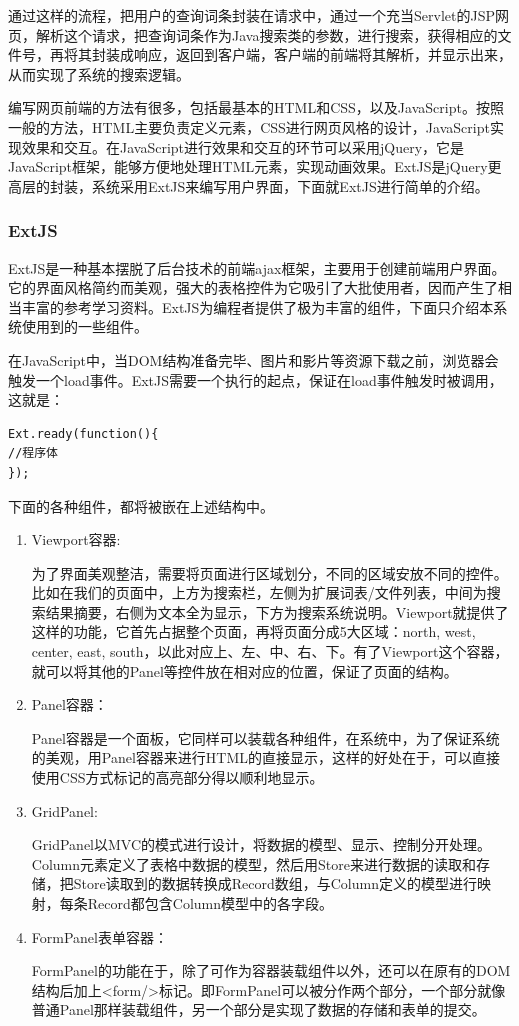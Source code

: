 \documentclass[12pt,a4paper]{article}
\begin{document}
	通过这样的流程，把用户的查询词条封装在请求中，通过一个充当Servlet的JSP网页，解析这个请求，把查询词条作为Java搜索类的参数，进行搜索，获得相应的文件号，再将其封装成响应，返回到客户端，客户端的前端将其解析，并显示出来，从而实现了系统的搜索逻辑。
	
	编写网页前端的方法有很多，包括最基本的HTML和CSS，以及JavaScript。按照一般的方法，HTML主要负责定义元素，CSS进行网页风格的设计，JavaScript实现效果和交互。在JavaScript进行效果和交互的环节可以采用jQuery，它是JavaScript框架，能够方便地处理HTML元素，实现动画效果。ExtJS是jQuery更高层的封装，系统采用ExtJS来编写用户界面，下面就ExtJS进行简单的介绍。
		
		\subsubsection{ExtJS}
	ExtJS是一种基本摆脱了后台技术的前端ajax框架，主要用于创建前端用户界面。它的界面风格简约而美观，强大的表格控件为它吸引了大批使用者，因而产生了相当丰富的参考学习资料。ExtJS为编程者提供了极为丰富的组件，下面只介绍本系统使用到的一些组件。
	
	在JavaScript中，当DOM结构准备完毕、图片和影片等资源下载之前，浏览器会触发一个load事件。ExtJS需要一个执行的起点，保证在load事件触发时被调用，这就是：
\lstset{language=JavaScript,frame=lines}
\begin{lstlisting}
Ext.ready(function(){
//程序体
});
\end{lstlisting}	

	下面的各种组件，都将被嵌在上述结构中。
\begin{enumerate}
\item
Viewport容器:

	为了界面美观整洁，需要将页面进行区域划分，不同的区域安放不同的控件。比如在我们的页面中，上方为搜索栏，左侧为扩展词表/文件列表，中间为搜索结果摘要，右侧为文本全为显示，下方为搜索系统说明。Viewport就提供了这样的功能，它首先占据整个页面，再将页面分成5大区域：north, west, center, east, south，以此对应上、左、中、右、下。有了Viewport这个容器，就可以将其他的Panel等控件放在相对应的位置，保证了页面的结构。
	
\item
Panel容器：

	Panel容器是一个面板，它同样可以装载各种组件，在系统中，为了保证系统的美观，用Panel容器来进行HTML的直接显示，这样的好处在于，可以直接使用CSS方式标记的高亮部分得以顺利地显示。
	
\item 
GridPanel:

	GridPanel以MVC的模式进行设计，将数据的模型、显示、控制分开处理。Column元素定义了表格中数据的模型，然后用Store来进行数据的读取和存储，把Store读取到的数据转换成Record数组，与Column定义的模型进行映射，每条Record都包含Column模型中的各字段。

\item
FormPanel表单容器：

	FormPanel的功能在于，除了可作为容器装载组件以外，还可以在原有的DOM结构后加上<form/>标记。即FormPanel可以被分作两个部分，一个部分就像普通Panel那样装载组件，另一个部分是实现了数据的存储和表单的提交。
	
\end{enumerate}
\end{document}
